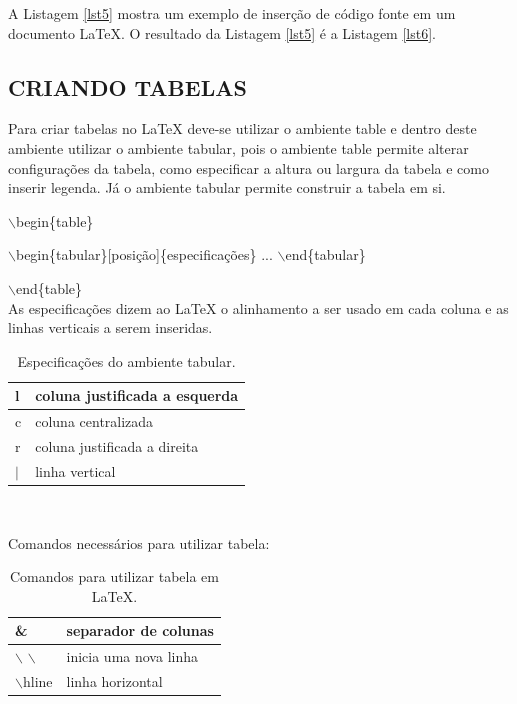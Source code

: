 A Listagem \ref{lst5} mostra um exemplo de inserção de código fonte em um documento LaTeX. O resultado da Listagem \ref{lst5} é a Listagem \ref{lst6}.\\



\newpage


\subsection{CRIANDO TABELAS}
Para criar tabelas no LaTeX deve-se utilizar o ambiente table e dentro deste ambiente utilizar o ambiente tabular, pois o ambiente table permite alterar configurações da tabela, como especificar a altura ou largura da tabela e como inserir legenda. Já o ambiente tabular permite construir a tabela em si.

$\backslash$begin\{table\}

$\backslash$begin\{tabular\}[posição]\{especificações\} ... $\backslash$end\{tabular\}

$\backslash$end\{table\}\\

As especificações dizem ao LaTeX o alinhamento a ser usado em cada coluna e as linhas verticais a serem inseridas.\\

\begin{table}[h]
	\centering
	\begin{tabular}{|l|l|}
	\hline
	l & coluna justificada a esquerda \\
	\hline
	c & coluna centralizada \\
	\hline
	r & coluna justificada a direita \\
	\hline
	$|$ & linha vertical \\
	\hline
\end{tabular}\\
\caption{Especificações do ambiente tabular.}
\label{tab1}
\end{table}

Comandos necessários para utilizar tabela:\\

\begin{table}[h]
	\centering
	\begin{tabular}{|l|l|}
	\hline
	\& & separador de colunas \\
	\hline
	$\backslash$ $\backslash$ & inicia uma nova linha \\
	\hline
	$\backslash$hline & linha horizontal \\
	\hline
\end{tabular}
\caption{Comandos para utilizar tabela em LaTeX.}
\label{tab2}
\end{table}

